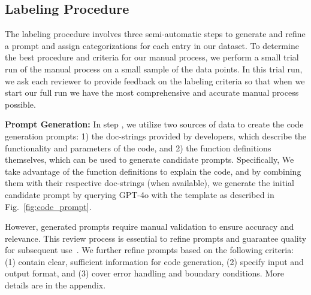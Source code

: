 \subsection{Labeling Procedure}

The labeling procedure involves three semi-automatic steps to generate and refine a prompt and assign categorizations for each entry in our \tool dataset. To determine the best procedure and criteria for our manual process, we perform a small trial run of the manual process on a small sample of the data points. In this trial run, we ask each reviewer to provide feedback on the labeling criteria so that when we start our full run we have
the most comprehensive and accurate manual process possible.

\textbf{Prompt Generation:} 
In step , we utilize two sources of data to create the code generation prompts: 1) the doc-strings provided by developers, which describe the functionality and parameters of the code, and 2) the function definitions themselves, which can be used to generate candidate prompts. Specifically, We take advantage of the function definitions to explain the code, and by combining them with their respective doc-strings (when available), we generate the initial candidate prompt by querying GPT-4o with the template as described in Fig.~\ref{fig:code_prompt}.





However, generated prompts require manual validation to ensure accuracy and relevance. This review process is essential to refine prompts and guarantee quality for subsequent use~\cite{shrivastava2023repository}. We further refine prompts based on the following criteria: (1) contain clear, sufficient information for code generation, (2) specify input and output format, and (3) cover error handling and boundary conditions. More details are in the appendix.

